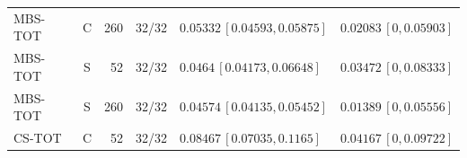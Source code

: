 \documentclass[10pt,a4paper]{article}
\begin{document}
\begin{longtable}{lcrcp{44mm}p{44mm}}
MBS-TOT & C & 260 & 32/32 & \(0.05332\,[0.04593,0.05875]\) & \(0.02083\,[0,0.05903]\)\\
MBS-TOT & S & 52 & 32/32 & \(0.0464\,[0.04173,0.06648]\) & \(0.03472\,[0,0.08333]\)\\
MBS-TOT & S & 260 & 32/32 & \(0.04574\,[0.04135,0.05452]\) & \(0.01389\,[0,0.05556]\)\\
CS-TOT & C & 52 & 32/32 & \(0.08467\,[0.07035,0.1165]\) & \(0.04167\,[0,0.09722]\)\\

\end{longtable}
\end{document}
